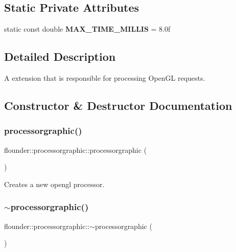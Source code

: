 \subsection*{Static Private Attributes}
\begin{DoxyCompactItemize}
\item 
\mbox{\label{classflounder_1_1processorgraphic_a5630d0d6c60e797cf18c20d7181ca723}} 
static const double {\bfseries M\+A\+X\+\_\+\+T\+I\+M\+E\+\_\+\+M\+I\+L\+L\+IS} = 8.\+0f
\end{DoxyCompactItemize}


\subsection{Detailed Description}
A extension that is responsible for processing Open\+GL requests. 



\subsection{Constructor \& Destructor Documentation}
\mbox{\label{classflounder_1_1processorgraphic_a2f29e90d39bd5bca3929f61779027c11}} 
\subsubsection{\texorpdfstring{processorgraphic()}{processorgraphic()}}
{\footnotesize\ttfamily flounder\+::processorgraphic\+::processorgraphic (\begin{DoxyParamCaption}{ }\end{DoxyParamCaption})}



Creates a new opengl processor. 

\mbox{\label{classflounder_1_1processorgraphic_a2d5f45c47b356c688adebc93e38b5af8}} 
\subsubsection{\texorpdfstring{$\sim$processorgraphic()}{~processorgraphic()}}
{\footnotesize\ttfamily flounder\+::processorgraphic\+::$\sim$processorgraphic (\begin{DoxyParamCaption}{ }\end{DoxyParamCaption})}




